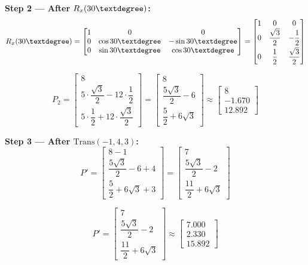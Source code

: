 \documentclass[12pt,a3paper]{article}
\begin{document}
\begin{enumerate}
\begin{tcolorbox}[enhanced,breakable,ansbox,colback=cD!4,colframe=cD,
  boxrule=0.8pt,arc=5pt,
  title={\textbf{Answer}},fonttitle=\bfseries\color{white},colbacktitle=cD]
\textbf{Step 2 — After $R_x(30\textdegree)$:}
\[
  R_x(30\textdegree) =
  \begin{bmatrix}
    1 & 0 & 0\\
    0 & \cos30\textdegree & -\sin30\textdegree\\
    0 & \sin30\textdegree & \cos30\textdegree
  \end{bmatrix}
  =
  \begin{bmatrix}
    1 & 0 & 0\\
    0 & \dfrac{\sqrt{3}}{2} & -\dfrac{1}{2}\\[6pt]
    0 & \dfrac{1}{2} & \dfrac{\sqrt{3}}{2}
  \end{bmatrix}
\]

\[
  P_2 = \begin{bmatrix}
    8\\[4pt]
    5 \cdot \dfrac{\sqrt{3}}{2} - 12 \cdot \dfrac{1}{2}\\[8pt]
    5 \cdot \dfrac{1}{2} + 12 \cdot \dfrac{\sqrt{3}}{2}
  \end{bmatrix}
  = \begin{bmatrix}
    8\\[4pt]
    \dfrac{5\sqrt{3}}{2} - 6\\[8pt]
    \dfrac{5}{2} + 6\sqrt{3}
  \end{bmatrix}
  \approx \begin{bmatrix}8\\-1.670\\12.892\end{bmatrix}
\]

\textbf{Step 3 — After $\mathrm{Trans}(-1,4,3)$:}
\[
  P' = \begin{bmatrix}
    8-1\\[4pt]
    \dfrac{5\sqrt{3}}{2}-6+4\\[8pt]
    \dfrac{5}{2}+6\sqrt{3}+3
  \end{bmatrix}
  = \begin{bmatrix}
    7\\[4pt]
    \dfrac{5\sqrt{3}}{2} - 2\\[8pt]
    \dfrac{11}{2} + 6\sqrt{3}
  \end{bmatrix}
\]

\[
  \boxed{P' = \begin{bmatrix}7\\[4pt]\dfrac{5\sqrt{3}}{2}-2\\[6pt]\dfrac{11}{2}+6\sqrt{3}\end{bmatrix}
  \approx \begin{bmatrix}7.000\\2.330\\15.892\end{bmatrix}}
\]


\end{tcolorbox}
\end{enumerate}
\end{document}
